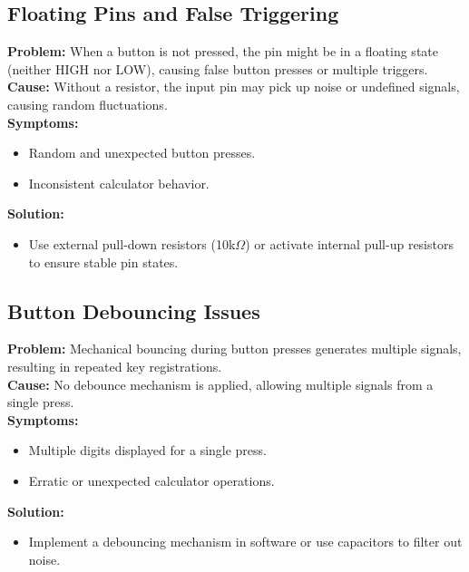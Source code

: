 \documentclass[journal]{IEEEtran}
\begin{document}
\subsection*{Floating Pins and False Triggering}
\textbf{Problem:} When a button is not pressed, the pin might be in a floating state (neither HIGH nor LOW), causing false button presses or multiple triggers. \\
\textbf{Cause:} Without a resistor, the input pin may pick up noise or undefined signals, causing random fluctuations. \\
\textbf{Symptoms:}
\begin{itemize}
    \item Random and unexpected button presses.
    \item Inconsistent calculator behavior.
\end{itemize}
\textbf{Solution:}
\begin{itemize}
    \item Use external pull-down resistors (10k$\Omega$) or activate internal pull-up resistors to ensure stable pin states.
\end{itemize}

\subsection*{Button Debouncing Issues}
\textbf{Problem:} Mechanical bouncing during button presses generates multiple signals, resulting in repeated key registrations. \\
\textbf{Cause:} No debounce mechanism is applied, allowing multiple signals from a single press. \\
\textbf{Symptoms:}
\begin{itemize}
    \item Multiple digits displayed for a single press.
    \item Erratic or unexpected calculator operations.
\end{itemize}
\textbf{Solution:}
\begin{itemize}
    \item Implement a debouncing mechanism in software or use capacitors to filter out noise.
\end{itemize}
\end{document}
